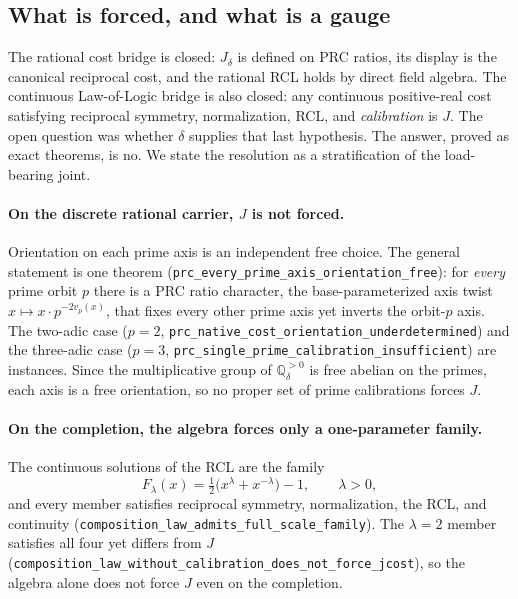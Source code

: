 \documentclass[11pt,a4paper]{article}
\theoremstyle{definition}
\theoremstyle{remark}
\begin{document}
\subsection{What is forced, and what is a gauge}\label{sec:native-cost-blocker}

The rational cost bridge is closed: $J_\delta$ is defined on PRC ratios, its
display is the canonical reciprocal cost, and the rational RCL holds by direct
field algebra. The continuous Law-of-Logic bridge is also closed: any continuous
positive-real cost satisfying reciprocal symmetry, normalization, RCL, and
\emph{calibration} is $J$. The open question was whether $\delta$ supplies that
last hypothesis. The answer, proved as exact theorems, is no. We state the
resolution as a stratification of the load-bearing joint.

\paragraph{On the discrete rational carrier, $J$ is not forced.}
Orientation on each prime axis is an independent free choice. The general
statement is one theorem
(\texttt{prc\_every\_prime\_axis\_orientation\_free}): for \emph{every} prime
orbit $p$ there is a PRC ratio character, the base-parameterized axis twist
$x \mapsto x \cdot p^{-2 v_p(x)}$, that fixes every other prime axis yet inverts
the orbit-$p$ axis. The two-adic case ($p = 2$,
\texttt{prc\_native\_cost\_orientation\_underdetermined}) and the three-adic case
($p = 3$, \texttt{prc\_single\_prime\_calibration\_insufficient}) are instances.
Since the multiplicative group of $\mathbb{Q}_\delta^{>0}$ is free abelian on the
primes, each axis is a free orientation, so no proper set of prime calibrations
forces $J$.

\paragraph{On the completion, the algebra forces only a one-parameter family.}
The continuous solutions of the RCL are the family
\[
  F_\lambda(x) = \tfrac{1}{2}\bigl(x^\lambda + x^{-\lambda}\bigr) - 1,
  \qquad \lambda > 0,
\]
and every member satisfies reciprocal symmetry, normalization, the RCL, and
continuity (\texttt{composition\_law\_admits\_full\_scale\_family}). The $\lambda
= 2$ member satisfies all four yet differs from $J$
(\texttt{composition\_law\_without\_calibration\_does\_not\_force\_jcost}), so the
algebra alone does not force $J$ even on the completion.
\end{document}
